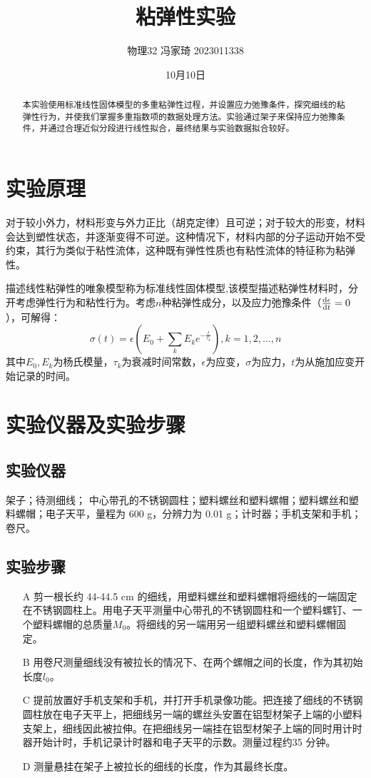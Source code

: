 \documentclass[ctex]{article}
\title{粘弹性实验}
\author{物理32   冯家琦   2023011338}
\date{10月10日}
\begin{document}
\maketitle
\begin{abstract}
    本实验使用标准线性固体模型的多重粘弹性过程，并设置应力弛豫条件，探究细线的粘弹性行为，并使我们掌握多重指数项的数据处理方法。实验通过架子来保持应力弛豫条件，并通过合理近似分段进行线性拟合，最终结果与实验数据拟合较好。
\end{abstract}
\section{实验原理}


对于较小外力，材料形变与外力正比（胡克定律）且可逆；对于较大的形变，材料会达到塑性状态，并逐渐变得不可逆。这种情况下，材料内部的分子运动开始不受约束，其行为类似于粘性流体，这种既有弹性性质也有粘性流体的特征称为粘弹性。\par
描述线性粘弹性的唯象模型称为标准线性固体模型,该模型描述粘弹性材料时，分开考虑弹性行为和粘性行为。考虑$n$种粘弹性成分，以及应力弛豫条件（$\dv{\epsilon}{t}=0$），可解得：
\begin{equation}
    \sigma(t)=\epsilon\left(E_0+\sum_kE_ke^{-\frac{t}{\tau_k}}\right),k=1,2,…,n
\end{equation}
其中$E_0,E_k$为杨氏模量，$\tau_k$为衰减时间常数，$\epsilon$为应变，$\sigma$为应力，$t$为从施加应变开始记录的时间。
\section{实验仪器及实验步骤}
\subsection{实验仪器}
架子；待测细线； 中心带孔的不锈钢圆柱；塑料螺丝和塑料螺帽；塑料螺丝和塑料螺帽；电子天平，量程为 600 g，分辨力为 0.01 g；计时器；手机支架和手机； 卷尺。

\subsection{实验步骤}
\begin{enumerate}
    \item[A] 剪一根长约 44-44.5 cm 的细线，用塑料螺丝和塑料螺帽将细线的一端固定在不锈钢圆柱上。用电子天平测量中心带孔的不锈钢圆柱和一个塑料螺钉、一个塑料螺帽的总质量$M_0$。将细线的另一端用另一组塑料螺丝和塑料螺帽固定。
     \item[B]用卷尺测量细线没有被拉长的情况下、在两个螺帽之间的长度，作为其初始长度$l_0$。
     \item[C]提前放置好手机支架和手机，并打开手机录像功能。把连接了细线的不锈钢圆柱放在电子天平上，把细线另一端的螺丝头安置在铝型材架子上端的小塑料支架上，细线因此被拉伸。在把细线另一端挂在铝型材架子上端的同时用计时器开始计时，手机记录计时器和电子天平的示数。测量过程约35 分钟。
     \item[D]测量悬挂在架子上被拉长的细线的长度，作为其最终长度。
\end{enumerate}
\end{document}
